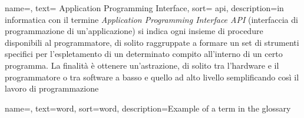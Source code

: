 \renewcommand{\acronymname}{Acronimi e abbreviazioni}

{
name=,
text= Application Programming Interface,
sort= api,
description={in informatica con il termine \emph{Application Programming Interface API} (interfaccia di programmazione di un'applicazione) si indica ogni insieme di procedure disponibili al programmatore, di solito raggruppate a formare un set di strumenti specifici per l'espletamento di un determinato compito all'interno di un certo programma.
La finalità è ottenere un'astrazione, di solito tra l'hardware e il programmatore o tra software a basso e quello ad alto livello semplificando così il lavoro di programmazione}
}




{
name=,
text=word,
sort=word,
description={Example of a term in the glossary}
}

